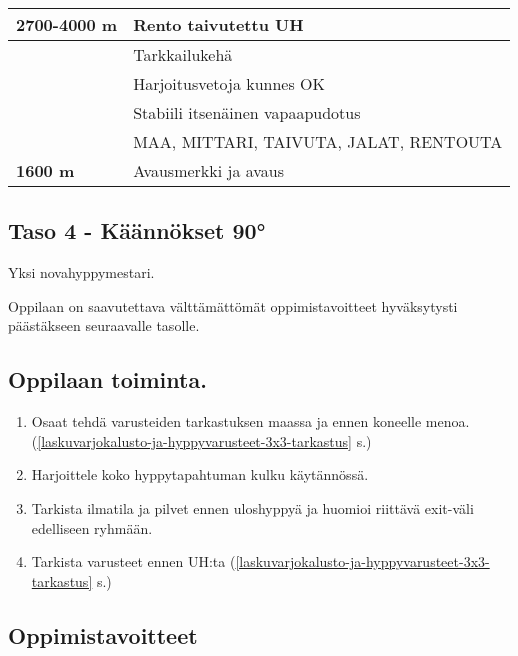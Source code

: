 \begin{multicols}{2}
\begin{tabular}[]{|l|p{4.7cm}|}
\hline
 \textbf{2700-4000 m} &  Rento taivutettu UH
\\ \hline
  &  Tarkkailukehä
\\ \hline
  &  Harjoitusvetoja kunnes OK
\\ \hline
  &  Stabiili itsenäinen vapaapudotus
\\ \hline
  &  MAA, MITTARI, TAIVUTA, JALAT, RENTOUTA
\\ \hline
 \textbf{1600 m} &  Avausmerkki ja avaus
\\ \hline
\end{tabular}

\end{multicols}\pagebreak\begin{multicols}{2} 

\section{ Taso 4 - Käännökset 90° }
\label{nova-alkeiskoulutuksen-suoritukset-taso-4-kaannokset-90deg}


Yksi novahyppymestari. 


Oppilaan on saavutettava välttämättömät oppimistavoitteet hyväksytysti päästäkseen seuraavalle tasolle. 

\subsection{ Oppilaan toiminta. }
\label{nova-alkeiskoulutuksen-suoritukset-oppilaan-toiminta}

\begin{enumerate}[label=\bfseries \arabic*)]
\item  Osaat tehdä varusteiden tarkastuksen maassa ja ennen koneelle menoa. (\ref{laskuvarjokalusto-ja-hyppyvarusteet-3x3-tarkastus} s.\pageref{laskuvarjokalusto-ja-hyppyvarusteet-3x3-tarkastus}) 
\item  Harjoittele koko hyppytapahtuman kulku käytännössä. 
\item  Tarkista ilmatila ja pilvet ennen uloshyppyä ja huomioi riittävä exit-väli edelliseen ryhmään. 
\item  Tarkista varusteet ennen UH:ta (\ref{laskuvarjokalusto-ja-hyppyvarusteet-3x3-tarkastus} s.\pageref{laskuvarjokalusto-ja-hyppyvarusteet-3x3-tarkastus}) 
\end{enumerate}
\subsection{ Oppimistavoitteet }
\label{nova-alkeiskoulutuksen-suoritukset-oppimistavoitteet}


\end{multicols}
